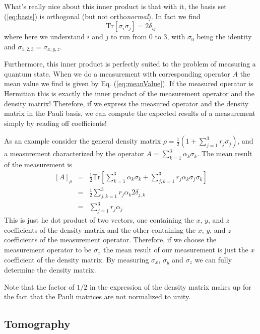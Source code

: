 \documentclass[twocolumn,english,aps,prl]{revtex4}
\begin{document}
What's really nice about this inner product is that with it, the basis set (\ref{eq:basis}) is orthogonal (but not ortho\emph{normal}). In fact we find \begin{equation}
\textrm{Tr} \left[ \sigma_i \sigma_j \right] = 2 \delta_{ij} \end{equation}
where here we understand $i$ and $j$ to run from 0 to 3, with $\sigma_0$ being the identity and $\sigma_{1,2,3} = \sigma_{x,y,z}$.

Furthermore, this inner product is perfectly suited to the problem of measuring a quantum state. When we do a measurement with corresponding operator $A$ the mean value we find is given by Eq. (\ref{eq:meanValue}). If the measured operator is Hermitian this is exactly the inner product of the measurement operator and the density matrix! Therefore, if we express the measured operator and the density matrix in the Pauli basis, we can compute the expected results of a measurement simply by reading off coefficients!

As an example consider the general density matrix $\rho = \frac{1}{2}(1+\sum_{j=1}^3 r_j \sigma_j)$, and a measurement characterized by the operator $A=\sum_{k=1}^3 \alpha_k \sigma_k$. The mean result of the measurement is \begin{eqnarray}
\left[ A \right]_{\rho} &=& \frac{1}{2}\textrm{Tr} \left[\sum_{k=1}^3 \alpha_k \sigma_k + \sum_{j,k=1}^3 r_j \alpha_k \sigma_j \sigma_k \right] \\
&=& \frac{1}{2} \sum_{j,k=1}^3 r_j \alpha_k 2\delta_{j,k} \\
&=& \sum_{j=1}^3 r_j \alpha_j \end{eqnarray}
This is just he dot product of two vectors, one containing the $x$, $y$, and $z$ coefficients of the density matrix and the other containing the $x$, $y$, and $z$ coefficients of the measurement operator. Therefore, if we choose the measurement operator to be $\sigma_x$ the mean result of our measurement is just the $x$ coefficient of the density matrix. By measuring $\sigma_x$, $\sigma_y$ and $\sigma_z$ we can fully determine the density matrix.

Note that the factor of $1/2$ in the expression of the density matrix makes up for the fact that the Pauli matrices are not normalized to unity.

\subsection{Tomography}
\end{document}
